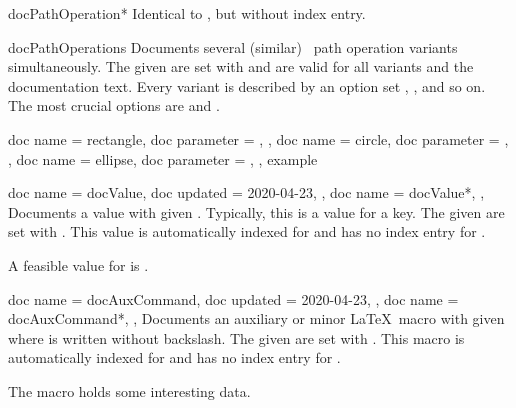 \begin{docEnvironment}[doclang/environment content=command description,
    doc new and updated={2019-09-18}{2020-04-22}]{docPathOperation*}{}
  Identical to , but without index entry.
\end{docEnvironment}


\begin{docEnvironment}[doclang/environment content=command description,
    doc new={2020-04-22}]{docPathOperations}{}
  Documents several (similar) \tikzname\ path operation variants simultaneously.
  The given  are set with  and are valid for
  all variants and the documentation text.
  Every variant is described by an option set , , and so on.
  The most crucial options are  and .
\begin{dispExample}
\begin{docPathOperations}
  {
    {
      doc name      = rectangle,
      doc parameter = ,
    },
    {
      doc name      = circle,
      doc parameter = ,
    },
    {
      doc name      = ellipse,
      doc parameter = ,
    },
  }
  example
\end{docPathOperations}
\end{dispExample}
\end{docEnvironment}


\clearpage
\begin{docCommands}[doc parameter oarg marg={options}{name}]
  {
    {
      doc name    = docValue,
      doc updated = 2020-04-23,
    },
    {
      doc name = docValue*,
    },
  }
  Documents a value with given . Typically, this is a value for a key.
  The given  are set with .
  This value is automatically indexed for 
  and has no index entry for .
\begin{dispExample}
A feasible value for  is .
\end{dispExample}
\end{docCommands}



\begin{docCommands}[doc parameter oarg marg={options}{name}]
  {
    {
      doc name    = docAuxCommand,
      doc updated = 2020-04-23,
    },
    {
      doc name = docAuxCommand*,
    },
  }
  Documents an auxiliary or minor \LaTeX\ macro with given 
  where  is written without backslash.
  The given  are set with .
  This macro is automatically indexed for 
  and has no index entry for .
\begin{dispExample}
The macro  holds some interesting data.
\end{dispExample}
\end{docCommands}



